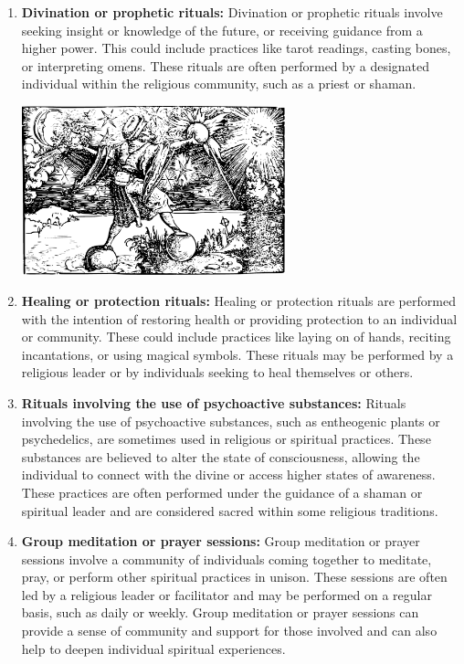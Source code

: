 \documentclass[12pt]{book}  %
\begin{document}
\begin{enumerate}
    \item \textbf{Divination or prophetic rituals:}
    Divination or prophetic rituals involve seeking insight or knowledge of the future, or receiving guidance from a higher power. This could include practices like tarot readings, casting bones, or interpreting omens. These rituals are often performed by a designated individual within the religious community, such as a priest or shaman.
    
    \begin{center}
        \includegraphics[width=0.6\textwidth]{./images/religion08.pdf}
    \end{center}

    \item \textbf{Healing or protection rituals:}
    Healing or protection rituals are performed with the intention of restoring health or providing protection to an individual or community. These could include practices like laying on of hands, reciting incantations, or using magical symbols. These rituals may be performed by a religious leader or by individuals seeking to heal themselves or others.

    \item \textbf{Rituals involving the use of psychoactive substances:}
    Rituals involving the use of psychoactive substances, such as entheogenic plants or psychedelics, are sometimes used in religious or spiritual practices. These substances are believed to alter the state of consciousness, allowing the individual to connect with the divine or access higher states of awareness. These practices are often performed under the guidance of a shaman or spiritual leader and are considered sacred within some religious traditions.

    \item \textbf{Group meditation or prayer sessions:}
    Group meditation or prayer sessions involve a community of individuals coming together to meditate, pray, or perform other spiritual practices in unison. These sessions are often led by a religious leader or facilitator and may be performed on a regular basis, such as daily or weekly. Group meditation or prayer sessions can provide a sense of community and support for those involved and can also help to deepen individual spiritual experiences.
    

\end{enumerate}
\end{document}
